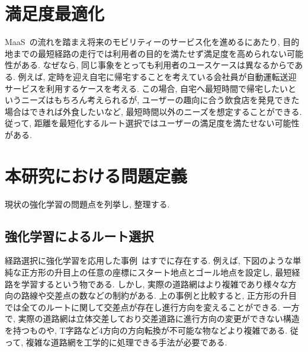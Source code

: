   
\section{満足度最適化}

MaaS~\cite{MaaS}の流れを踏まえ将来のモビリティーのサービス化を進めるにあたり, 目的地までの最短経路の走行では利用者の目的を満たせず満足度を高められない可能性がある.
なぜなら, 同じ事象をとっても利用者のユースケースは異なるからである. 例えば, 定時を迎え自宅に帰宅することを考えている会社員が自動運転送迎サービスを利用するケースを考える.
この場合, 自宅へ最短時間で帰宅したいというニーズはもちろん考えられるが, ユーザーの趣向に合う飲食店を発見できた場合はできれば外食したいなど, 最短時間以外のニーズを想定することができる.
従って, 距離を最短化するルート選択ではユーザーの満足度を満たせない可能性がある.


\section{本研究における問題定義}

現状の強化学習の問題点を列挙し, 整理する.

\subsection{強化学習によるルート選択}

経路選択に強化学習を応用した事例~\cite{DQNRouteSimple}はすでに存在する. 例えば, 下図のような単純な正方形の升目上の任意の座標にスタート地点とゴール地点を設定し, 最短経路を学習するという物である. 
しかし, 実際の道路網はより複雑であり様々な方向の路線や交差点の数などの制約がある. 上の事例と比較すると, 正方形の升目では全てのルートに関して交差点が存在し進行方向を変えることができる. 一方で,
実際の道路網は立体交差しており交差道路に進行方向の変更ができない構造を持つものや, T字路など4方向の方向転換が不可能な物などより複雑である.
従って, 複雑な道路網を工学的に処理できる手法が必要である.

